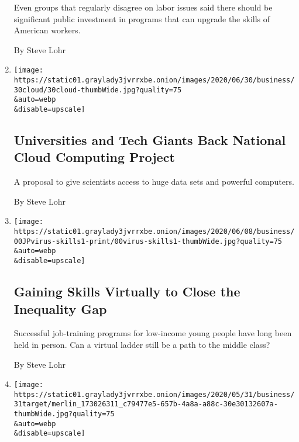\begin{enumerate}
  Even groups that regularly disagree on labor issues said there should
  be significant public investment in programs that can upgrade the
  skills of American workers.

  By Steve Lohr
\item
  \href{/2020/06/30/technology/national-cloud-computing-project.html}{}

  \texttt{[image: https://static01.graylady3jvrrxbe.onion/images/2020/06/30/business/30cloud/30cloud-thumbWide.jpg?quality=75\\\&auto=webp\\\&disable=upscale]}

  \hypertarget{universities-and-tech-giants-back-national-cloud-computing-project}{%
  \subsection{Universities and Tech Giants Back National Cloud Computing
  Project}\label{universities-and-tech-giants-back-national-cloud-computing-project}}

  A proposal to give scientists access to huge data sets and powerful
  computers.

  By Steve Lohr
\item
  \href{/2020/06/07/technology/virtual-skills-inequality-gap-virus.html}{}

  \texttt{[image: https://static01.graylady3jvrrxbe.onion/images/2020/06/08/business/00JPvirus-skills1-print/00virus-skills1-thumbWide.jpg?quality=75\\\&auto=webp\\\&disable=upscale]}

  \hypertarget{gaining-skills-virtually-to-close-the-inequality-gap}{%
  \subsection{Gaining Skills Virtually to Close the Inequality
  Gap}\label{gaining-skills-virtually-to-close-the-inequality-gap}}

  Successful job-training programs for low-income young people have long
  been held in person. Can a virtual ladder still be a path to the
  middle class?

  By Steve Lohr
\item
  \href{/2020/05/31/business/target-closing-or-cutting-hours-George-Floyd.html}{}

  \texttt{[image: https://static01.graylady3jvrrxbe.onion/images/2020/05/31/business/31target/merlin\_173026311\_c79477e5-657b-4a8a-a88c-30e30132607a-thumbWide.jpg?quality=75\\\&auto=webp\\\&disable=upscale]}

  \hypertarget{target-temporarily-closing-or-shortening-hours-at-200-stores}{%
}
\end{enumerate}
